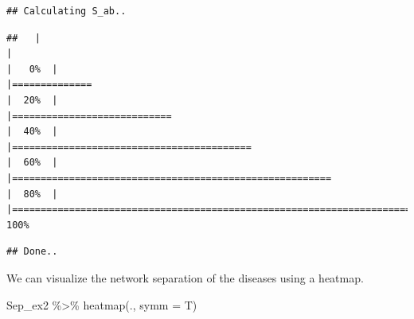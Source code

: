 \documentclass[
]{book}
\newenvironment{Shaded}{\begin{snugshade}}{\end{snugshade}}
\newcommand{\AttributeTok}[1]{\textcolor[rgb]{0.77,0.63,0.00}{#1}}
\newcommand{\FunctionTok}[1]{\textcolor[rgb]{0.00,0.00,0.00}{#1}}
\newcommand{\NormalTok}[1]{#1}
\newcommand{\OtherTok}[1]{\textcolor[rgb]{0.56,0.35,0.01}{#1}}
\newcommand{\SpecialCharTok}[1]{\textcolor[rgb]{0.00,0.00,0.00}{#1}}
\begin{document}
\begin{verbatim}
## Calculating S_ab..
\end{verbatim}

\begin{verbatim}
##   |                                                                              |                                                                      |   0%  |                                                                              |==============                                                        |  20%  |                                                                              |============================                                          |  40%  |                                                                              |==========================================                            |  60%  |                                                                              |========================================================              |  80%  |                                                                              |======================================================================| 100%
\end{verbatim}

\begin{verbatim}
## Done..
\end{verbatim}

\begin{Shaded}
\end{Shaded}

We can visualize the network separation of the diseases using a heatmap.

\begin{Shaded}
\begin{Highlighting}[]
\NormalTok{Sep\_ex2 }\SpecialCharTok{\%\textgreater{}\%} \FunctionTok{heatmap}\NormalTok{(., }\AttributeTok{symm =}\NormalTok{ T)}
\end{Highlighting}
\end{Shaded}
\end{document}
